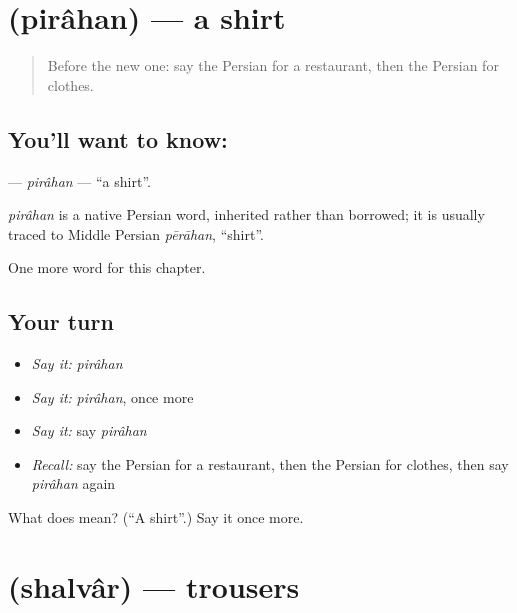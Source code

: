 \section[\texorpdfstring{\fa{پیراهن} (pirâhan)}{پیراهن (pirâhan)}]{ (pirâhan) — a shirt}

\label{lesson:FA-C73-pirahan}



\begin{quote}
Before the new one: say the Persian for a restaurant, then the Persian for clothes.
\end{quote}

\subsection*{You'll want to know: }
\textbf{} — \emph{pirâhan} — \textquotedblleft{}a shirt\textquotedblright{}.

\begin{cousinweb}
\emph{pirâhan} is a native Persian word, inherited rather than borrowed; it is usually traced to Middle Persian \emph{pērāhan}, \textquotedblleft{}shirt\textquotedblright{}.
\end{cousinweb}

\begin{grammarlens}[title={What you've built}]
One more word for this chapter.
\end{grammarlens}

\subsection*{Your turn}
\begin{itemize}
\raggedright
  \item \emph{Say it:} \emph{pirâhan}
  \item \emph{Say it:} \emph{pirâhan}, once more
  \item \emph{Say it:} say \emph{pirâhan}
  \item \emph{Recall:} say the Persian for a restaurant, then the Persian for clothes, then say \emph{pirâhan} again
\end{itemize}

\begin{tcolorbox}[breakable,colback=teal!4,colframe=teal!35!black,title={Before you move on}]
What does  mean? (\textquotedblleft{}A shirt\textquotedblright{}.) Say it once more.
\end{tcolorbox}
\section[\texorpdfstring{\fa{شلوار} (shalvâr)}{شلوار (shalvâr)}]{ (shalvâr) — trousers}

